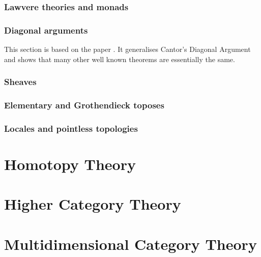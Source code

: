 \subsection{Lawvere theories and monads}

\subsection{Diagonal arguments}\label{sec:category-theory:diagonal-arguments}
This section is based on the paper \cite{lawvere:diagonal_arguments_and_cartesian_closed_categories}. It generalises Cantor's Diagonal Argument and shows that many other well known theorems are essentially the same.




\subsection{Sheaves}

\subsection{Elementary and Grothendieck toposes}

\subsection{Locales and pointless topologies}



\chapter{Homotopy Theory}\label{cha:homotopy-theory}

\chapter{Higher Category Theory}\label{cha:higher-category-theory}

\chapter{Multidimensional Category Theory}\label{cha:mult-categ-theory}



